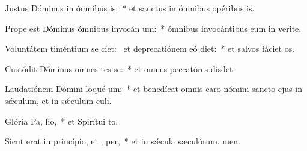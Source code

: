 \item Justus Dóminus in ómnibus  is:~* et sanctus in ómnibus opéribus is.
\item Prope est Dóminus ómnibus invocán um:~* ómnibus invocántibus eum in verite.
\item Voluntátem timéntium se ciet:~\pscross{} et deprecatiónem eó diet:~* et salvos fáciet os.
\item Custódit Dóminus omnes tes se:~* et omnes peccatóres disdet.
\item Laudatiónem Dómini loqué  um:~* et benedícat omnis caro nómini sancto ejus in sǽculum, et in sǽculum culi.
\item Glória Pa,  lio,~* et Spirítui to.
\item Sicut erat in princípio, et ,  per,~* et in sǽcula sæculórum. men.
